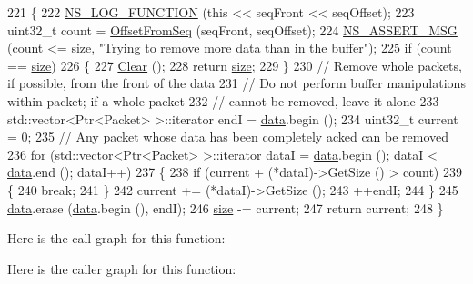 \begin{DoxyCode}
221 \{
222   \hyperlink{log-macros-disabled_8h_a90b90d5bad1f39cb1b64923ea94c0761}{NS\_LOG\_FUNCTION} (\textcolor{keyword}{this} << seqFront << seqOffset);
223   uint32\_t count = \hyperlink{classns3_1_1PendingData_ac537be2c08b079744b3b74cd70a5a66c}{OffsetFromSeq} (seqFront, seqOffset);
224   \hyperlink{assert_8h_aff5ece9066c74e681e74999856f08539}{NS\_ASSERT\_MSG} (count <= \hyperlink{classns3_1_1PendingData_a7ab8727ea8af4328619add818c858208}{size}, \textcolor{stringliteral}{"Trying to remove more data than in the buffer"}); 
225   \textcolor{keywordflow}{if} (count == \hyperlink{classns3_1_1PendingData_a7ab8727ea8af4328619add818c858208}{size})
226     \{
227       \hyperlink{classns3_1_1PendingData_a5172e78fb88b0a2a93e320c19411aab8}{Clear} ();
228       \textcolor{keywordflow}{return} \hyperlink{classns3_1_1PendingData_a7ab8727ea8af4328619add818c858208}{size};
229     \}
230   \textcolor{comment}{// Remove whole packets, if possible, from the front of the data}
231   \textcolor{comment}{// Do not perform buffer manipulations within packet; if a whole packet}
232   \textcolor{comment}{// cannot be removed, leave it alone}
233   std::vector<Ptr<Packet> >::iterator endI = \hyperlink{classns3_1_1PendingData_ab6ccbe1d5ca0d4536e4ad454971eb460}{data}.begin ();
234   uint32\_t current = 0;
235   \textcolor{comment}{// Any packet whose data has been completely acked can be removed}
236   \textcolor{keywordflow}{for} (std::vector<Ptr<Packet> >::iterator dataI = \hyperlink{classns3_1_1PendingData_ab6ccbe1d5ca0d4536e4ad454971eb460}{data}.begin (); dataI < 
      \hyperlink{classns3_1_1PendingData_ab6ccbe1d5ca0d4536e4ad454971eb460}{data}.end (); dataI++)
237     \{
238       \textcolor{keywordflow}{if} (current + (*dataI)->GetSize () > count)
239         \{
240           \textcolor{keywordflow}{break};
241         \}
242       current += (*dataI)->GetSize ();
243       ++endI;
244     \}
245   \hyperlink{classns3_1_1PendingData_ab6ccbe1d5ca0d4536e4ad454971eb460}{data}.erase (\hyperlink{classns3_1_1PendingData_ab6ccbe1d5ca0d4536e4ad454971eb460}{data}.begin (), endI);
246   \hyperlink{classns3_1_1PendingData_a7ab8727ea8af4328619add818c858208}{size} -= current;
247   \textcolor{keywordflow}{return} current;
248 \}
\end{DoxyCode}


Here is the call graph for this function\+:




Here is the caller graph for this function\+:


